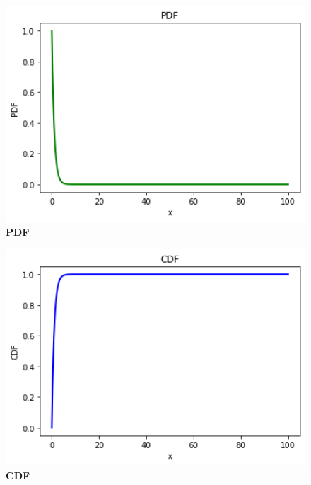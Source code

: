 \documentclass[journal,12pt,twocolumn]{IEEEtran}
\begin{document}
\begin{figure}
\includegraphics[width=15cm]{figure_1.png}
    \caption{\textbf{\huge{PDF}}} 
\end{figure}
\begin{figure}
\includegraphics[width=15cm]{figure_2.png}
    \caption{\textbf{\huge{CDF}}}
\end{figure}
\end{document}
